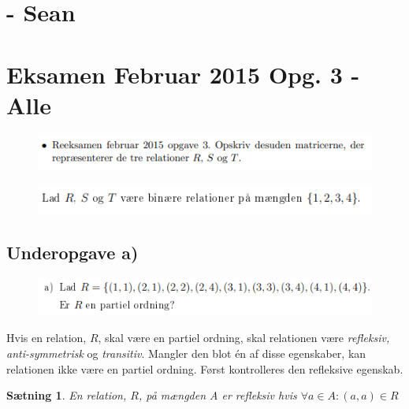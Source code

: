 \documentclass{article}
\newtheorem{theorem}{Sætning}
\begin{document}
\section{- Sean}

\section{Eksamen Februar 2015 Opg. 3 - Alle}
\begin{figure}[h]
\begin{center}
\includegraphics[scale=0.9]{2015Opgave3Formulering}
\end{center}
\end{figure}
\begin{figure}[h]
\begin{center}
\includegraphics[scale=0.9]{2015Opgave3FormuleringOver}
\end{center}
\end{figure}


\subsection{Underopgave a)}
\begin{figure}[h]
\begin{center}
\includegraphics[scale=0.9]{2015Opgave3FormuleringA}
\end{center}
\end{figure}

Hvis en relation, $R$, skal være en partiel ordning, skal relationen være \emph{refleksiv, anti-symmetrisk} og \emph{transitiv}. Mangler den blot én af disse egenskaber, kan relationen ikke være en partiel ordning. Først kontrolleres den refleksive egenskab.

\begin{theorem}
En relation, $R$, på mængden A er refleksiv hvis $\forall a \in A : (a,a) \in R$
\end{theorem}
\end{document}
